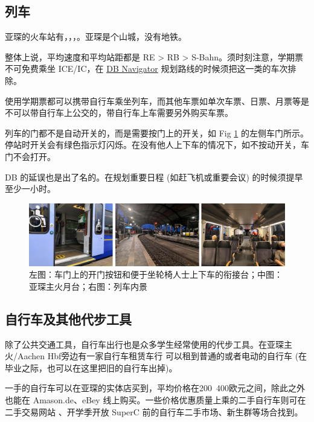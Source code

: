   \subsection{列车}\label{subsec:列车}

    亚琛的火车站有，，，。亚琛是个山城，没有地铁。

    整体上说，平均速度和平均站距都是 RE > RB > S-Bahn。须时刻注意，学期票不可免费乘坐 ICE/IC，在 \href{https://www.bahn.de/p/view/service/mobile/db-navigator.shtml}{DB Navigator} 规划路线的时候须把这一类的车次排除。

    使用学期票都可以携带自行车乘坐列车，而其他车票如单次车票、日票、月票等是不可以带自行车上公交的，带自行车上车需要另外购买车票。

    列车的门都不是自动开关的，而是需要按门上的开关，如 Fig \ref{fig:列车图集} 的左侧车门所示。停站时开关会有绿色指示灯闪烁。在没有他人上下车的情况下，如不按动开关，车门不会打开。

    DB 的延误也是出了名的。在规划重要日程 (如赶飞机或重要会议) 的时候须提早至少一小时。

    \begin{figure}[ht]
      \centering
      \includegraphics[width=\textwidth]{在亚琛学习和生活/Verkersmittel/左图：车门上的开门按钮和便于坐轮椅人士上下车的衔接台；中图：亚琛主火月台；右图：列车内景.png}
      \caption{左图：车门上的开门按钮和便于坐轮椅人士上下车的衔接台；中图：亚琛主火月台；右图：列车内景}
      \label{fig:列车图集}
    \end{figure}

  \subsection{自行车及其他代步工具}\label{subsec:自行车及其他代步工具}

    除了公共交通工具，自行车出行也是众多学生经常使用的代步工具。在亚琛主火/Aachen Hbf旁边有一家自行车租赁车行  可以租到普通的或者电动的自行车 (在毕业之际，也可以在这里把旧的自行车出掉)。

    一手的自行车可以在亚琛的实体店买到，平均价格在200~400欧元之间，除此之外也能在 Amason.de、eBey 线上购买。一些价格优惠质量上乘的二手自行车则可在二手交易网站 、开学季开放 SuperC 前的自行车二手市场、新生群等场合找到。

